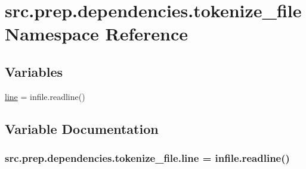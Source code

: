 \hypertarget{namespacesrc_1_1prep_1_1dependencies_1_1tokenize__file}{}\section{src.\+prep.\+dependencies.\+tokenize\+\_\+file Namespace Reference}
\label{namespacesrc_1_1prep_1_1dependencies_1_1tokenize__file}
\subsection*{Variables}
\begin{DoxyCompactItemize}
\item 
\hyperlink{namespacesrc_1_1prep_1_1dependencies_1_1tokenize__file_a2d4323c7f10b864ac231ea59f23bc285}{line} = infile.\+readline()
\end{DoxyCompactItemize}


\subsection{Variable Documentation}
\subsubsection[{\texorpdfstring{line}{line}}]{\setlength{\rightskip}{0pt plus 5cm}src.\+prep.\+dependencies.\+tokenize\+\_\+file.\+line = infile.\+readline()}\hypertarget{namespacesrc_1_1prep_1_1dependencies_1_1tokenize__file_a2d4323c7f10b864ac231ea59f23bc285}{}\label{namespacesrc_1_1prep_1_1dependencies_1_1tokenize__file_a2d4323c7f10b864ac231ea59f23bc285}
